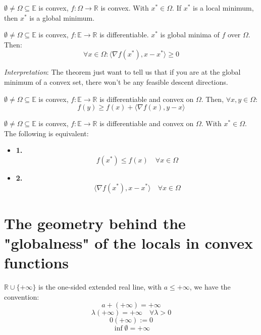 \documentclass[11pt,a4paper]{article}
\begin{document}
\begin{thmbox}
$\emptyset \neq \Omega \subseteq \mathds{E}$ is convex, $f: \Omega \rightarrow \mathds{R}$ is convex. With $x^* \in \Omega$. If $x^*$ is a local minimum, then $x^*$ is a global minimum.
\end{thmbox}

\begin{thmbox}
$\emptyset \neq \Omega \subseteq \mathds{E}$ is convex, $f: \mathds{E} \rightarrow \mathds{R}$ is differentiable. $x^*$ is global minima of $f$ over $\Omega$. Then:
\[
\forall x \in \Omega: \langle\nabla f(x^*), x - x^*\rangle \ge 0 
\]

\textit{Interpretation}: The theorem just want to tell us that if you are at the global minimum of a convex set, there won't be any feasible descent directions.
\end{thmbox}

\begin{thmbox}
$\emptyset \neq \Omega \subseteq \mathds{E}$ is convex, $f: \mathds{E} \rightarrow \mathds{R}$ is differentiable and convex on $\Omega$. Then, $\forall x,y \in \Omega$:
\[
f(y) \ge f(x) + \langle\nabla f(x), y-x\rangle
\]
\end{thmbox}

\begin{thmbox}
$\emptyset \neq \Omega \subseteq \mathds{E}$ is convex, $f: \mathds{E} \rightarrow \mathds{R}$ is differentiable and convex on $\Omega$. With $x^* \in \Omega$. The following is equivalent:
\begin{itemize}
    \item \textbf{1.}\[f(x^*) \le f(x) \quad \forall x \in \Omega\]
    \item \textbf{2.}\[\langle \nabla f(x^*), x-x^*\rangle \quad \forall x \in \Omega\]
\end{itemize}
\end{thmbox}

\section{The geometry behind the "globalness" of the locals in convex functions}

\begin{defbox}
$\mathds{R} \cup \{+\infty\}$ is the one-sided extended real line, with $a \le +\infty$, we have the convention:
\[a + (+\infty) = +\infty\]
\[\lambda(+\infty) = +\infty \quad \forall \lambda > 0\]
\[0(+\infty) := 0\]
\[\inf \emptyset = +\infty\]
\end{defbox}
\end{document}
